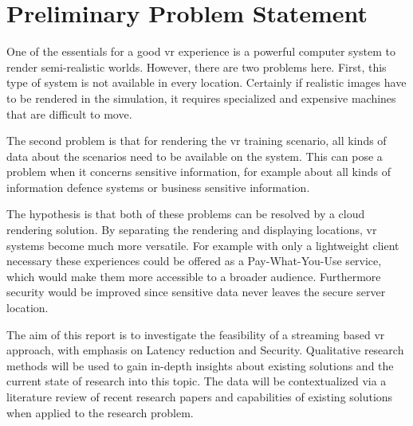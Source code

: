 \section{Preliminary Problem Statement}
One of the essentials for a good \acrfull{vr} experience is a powerful computer system to render semi-realistic
worlds. However, there are two problems here. First, this type of system is not available in every location.
Certainly if realistic images have to be rendered in the simulation, it requires specialized and expensive machines that are difficult to move. 

The second problem is that for rendering the \acrshort{vr} training scenario, all kinds of data about the scenarios need to be available on the system. 
This can pose a problem when it concerns sensitive information, for example about all kinds of information defence systems or business sensitive information.

The hypothesis is that both of these problems can be resolved by a cloud rendering solution. By separating the rendering and displaying locations, \acrshort{vr} systems become much more versatile. For example with only a lightweight client necessary these experiences could be offered as a Pay-What-You-Use service, which would make them more accessible to a broader audience. Furthermore security would be improved since sensitive data never leaves the secure server location.

The aim of this report is to investigate the feasibility of a streaming based \acrshort{vr} approach, with emphasis on Latency reduction and Security.
Qualitative research methods will be used to gain in-depth insights about existing solutions and the current state of research into this topic.
The data will be contextualized via a literature review of recent research papers and capabilities of existing solutions when applied to the research problem.